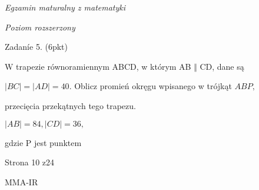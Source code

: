 \documentclass[a4paper,12pt]{article}
\begin{document}
{\it Egzamin maturalny z matematyki}

{\it Poziom rozszerzony}

Zadaníe 5. (6pkt)

$\mathrm{W}$ trapezie równoramiennym ABCD, w którym AB $\Vert$ CD, dane są

$|BC|=|AD|=40$. Oblicz promień okręgu wpisanego w trójkąt $ABP,$

przecięcia przekątnych tego trapezu.

$|AB|=84, |CD|=36,$

gdzie P jest punktem

Strona 10 z24

MMA-IR
\end{document}
